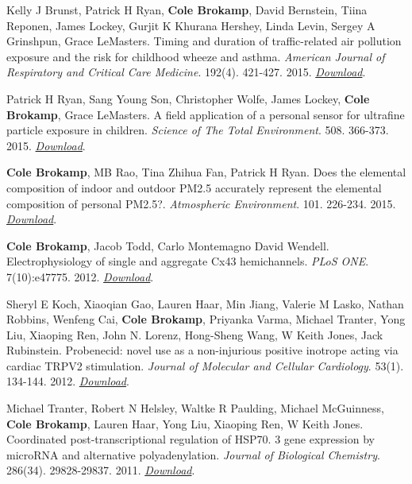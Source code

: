 Kelly J Brunst, Patrick H Ryan, \textbf{Cole Brokamp}, David Bernstein,
Tiina Reponen, James Lockey, Gurjit K Khurana Hershey, Linda Levin,
Sergey A Grinshpun, Grace LeMasters. Timing and duration of
traffic-related air pollution exposure and the risk for childhood wheeze
and asthma. \emph{American Journal of Respiratory and Critical Care
Medicine}. 192(4). 421-427. 2015.
\href{http://colebrokamp-website.s3.amazonaws.com/publications/Brunst_AmJRespCritCareMed_2015.pdf}{\emph{Download}}.

Patrick H Ryan, Sang Young Son, Christopher Wolfe, James Lockey,
\textbf{Cole Brokamp}, Grace LeMasters. A field application of a
personal sensor for ultrafine particle exposure in children.
\emph{Science of The Total Environment}. 508. 366-373. 2015.
\href{http://colebrokamp-website.s3.amazonaws.com/publications/Ryan_SciTotEnv_2015.pdf}{\emph{Download}}.

\textbf{Cole Brokamp}, MB Rao, Tina Zhihua Fan, Patrick H Ryan. Does the
elemental composition of indoor and outdoor PM2.5 accurately represent
the elemental composition of personal PM2.5?. \emph{Atmospheric
Environment}. 101. 226-234. 2015.
\href{http://colebrokamp-website.s3.amazonaws.com/publications/Brokamp_AtmosEnv_2015.pdf}{\emph{Download}}.

\textbf{Cole Brokamp}, Jacob Todd, Carlo Montemagno David Wendell.
Electrophysiology of single and aggregate Cx43 hemichannels. \emph{PLoS
ONE}. 7(10):e47775. 2012.
\href{http://colebrokamp-website.s3.amazonaws.com/publications/Brokamp_PLoSOne_2012.pdf}{\emph{Download}}.

Sheryl E Koch, Xiaoqian Gao, Lauren Haar, Min Jiang, Valerie M Lasko,
Nathan Robbins, Wenfeng Cai, \textbf{Cole Brokamp}, Priyanka Varma,
Michael Tranter, Yong Liu, Xiaoping Ren, John N. Lorenz, Hong-Sheng
Wang, W Keith Jones, Jack Rubinstein. Probenecid: novel use as a
non-injurious positive inotrope acting via cardiac TRPV2 stimulation.
\emph{Journal of Molecular and Cellular Cardiology}. 53(1). 134-144.
2012.
\href{http://colebrokamp-website.s3.amazonaws.com/publications/Koch_JMolCellCardiol_2011.pdf}{\emph{Download}}.

Michael Tranter, Robert N Helsley, Waltke R Paulding, Michael
McGuinness, \textbf{Cole Brokamp}, Lauren Haar, Yong Liu, Xiaoping Ren,
W Keith Jones. Coordinated post-transcriptional regulation of HSP70. 3
gene expression by microRNA and alternative polyadenylation.
\emph{Journal of Biological Chemistry}. 286(34). 29828-29837. 2011.
\href{http://colebrokamp-website.s3.amazonaws.com/publications/Tranter_JBiolChem_2011.pdf}{\emph{Download}}.
